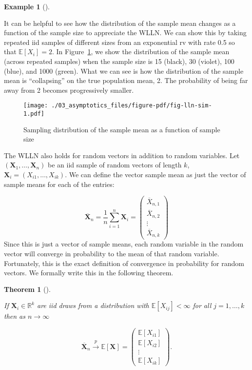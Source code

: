 \documentclass[
  letterpaper,
  DIV=11,
  numbers=noendperiod]{scrreprt}
\newcommand{\mb}{\symbf}
\newcommand{\E}{\mathbb{E}}
\newcommand{\Xbar}{\overline{X}}
\newcommand{\X}{\mb{X}}
\newcommand{\inprob}{\overset{p}{\to}}
\theoremstyle{definition}
\theoremstyle{plain}
\newtheorem{theorem}{Theorem}[chapter]
\theoremstyle{definition}
\newtheorem{example}{Example}[chapter]
\theoremstyle{remark}
\begin{document}
\leavevmode{}%
\begin{example}[]\label{exm-lln}

It can be helpful to see how the distribution of the sample mean changes
as a function of the sample size to appreciate the WLLN. We can show
this by taking repeated iid samples of different sizes from an
exponential rv with rate 0.5 so that \(\E[X_i] = 2\). In
Figure~\ref{fig-lln-sim}, we show the distribution of the sample mean
(across repeated samples) when the sample size is 15 (black), 30
(violet), 100 (blue), and 1000 (green). What we can see is how the
distribution of the sample mean is ``collapsing'' on the true population
mean, 2. The probability of being far away from 2 becomes progressively
smaller.

\begin{figure}

{\centering \texttt{[image: ./03\_asymptotics\_files/figure-pdf/fig-lln-sim-1.pdf]}

}

\caption{\label{fig-lln-sim}Sampling distribution of the sample mean as
a function of sample size}

\end{figure}

\end{example}

The WLLN also holds for random vectors in addition to random variables.
Let \((\X_1, \ldots, \X_n)\) be an iid sample of random vectors of
length \(k\), \(\mb{X}_i = (X_{i1}, \ldots, X_{ik})\). We can define the
vector sample mean as just the vector of sample means for each of the
entries:

\[
\overline{\mb{X}}_n = \frac{1}{n} \sum_{i=1}^n \mb{X}_i =
\begin{pmatrix}
\Xbar_{n,1} \\ \Xbar_{n,2} \\ \vdots \\ \Xbar_{n, k}
\end{pmatrix}
\] Since this is just a vector of sample means, each random variable in
the random vector will converge in probability to the mean of that
random variable. Fortunately, this is the exact definition of
convergence in probability for random vectors. We formally write this in
the following theorem.

\leavevmode{}%
\begin{theorem}[]\label{thm-vector-wlln}

If \(\X_i \in \mathbb{R}^k\) are iid draws from a distribution with
\(\E[X_{ij}] < \infty\) for all \(j=1,\ldots,k\) then as
\(n\rightarrow\infty\)

\[
\overline{\mb{X}}_n \inprob \E[\X]  =
\begin{pmatrix}
\E[X_{i1}] \\ \E[X_{i2}] \\ \vdots \\ \E[X_{ik}]
\end{pmatrix}.
\]

\end{theorem}
\end{document}
